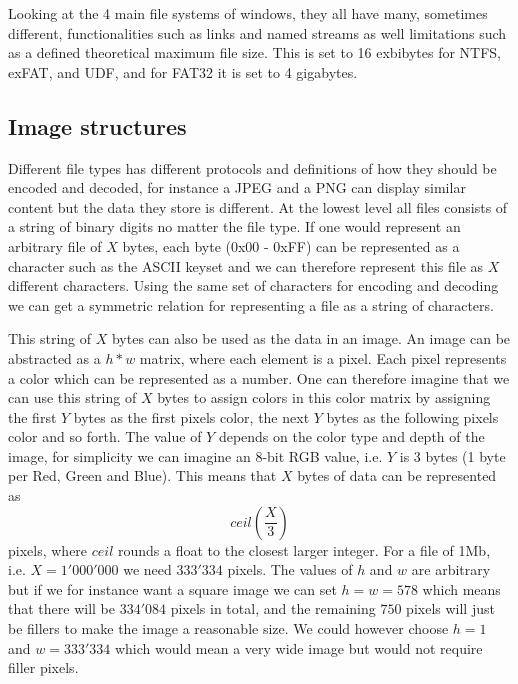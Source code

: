 Looking at the 4 main file systems of windows, they all have many, sometimes different, functionalities such as links and named streams as well limitations such as a defined theoretical maximum file size\cite{mikbenFileSystemFunctionality}. This is set to 16 exbibytes for NTFS, exFAT, and UDF, and for FAT32 it is set to 4 gigabytes. 

\subsection{Image structures}
Different file types has different protocols and definitions of how they should be encoded and decoded, for instance a JPEG and a PNG can display similar content but the data they store is different. At the lowest level all files consists of a string of binary digits no matter the file type. If one would represent an arbitrary file of $X$ bytes, each byte (0x00 - 0xFF) can be represented as a character such as the ASCII keyset and we can therefore represent this file as $X$ different characters. Using the same set of characters for encoding and decoding we can get a symmetric relation for representing a file as a string of characters. 

This string of $X$ bytes can also be used as the data in an image. An image can be abstracted as a $h * w$ matrix, where each element is a pixel. Each pixel represents a color which can be represented as a number. One can therefore imagine that we can use this string of $X$ bytes to assign colors in this color matrix by assigning the first $Y$ bytes as the first pixels color, the next $Y$ bytes as the following pixels color and so forth. The value of $Y$ depends on the color type and depth of the image, for simplicity we can imagine an 8-bit RGB value, i.e. $Y$ is 3 bytes (1 byte per Red, Green and Blue). This means that $X$ bytes of data can be represented as 
$$ceil(\frac{X}{3})$$ 
pixels, where $ceil$ rounds a float to the closest larger integer. For a file of 1Mb, i.e. $X = 1'000'000$ we need $333'334$ pixels. The values of $h$ and $w$ are arbitrary but if we for instance want a square image we can set $ h = w = 578$ which means that there will be $334'084$ pixels in total, and the remaining $750$ pixels will just be fillers to make the image a reasonable size. We could however choose $h = 1$ and $w = 333'334$ which would mean a very wide image but would not require filler pixels.